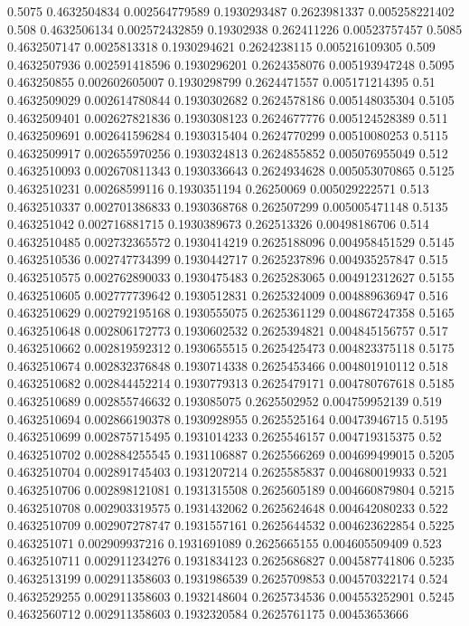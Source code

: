 {0.5075 0.4632504834 0.002564779589 0.1930293487 0.2623981337 0.005258221402
0.508 0.4632506134 0.002572432859 0.19302938 0.262411226 0.00523757457
0.5085 0.4632507147 0.0025813318 0.1930294621 0.2624238115 0.005216109305
0.509 0.4632507936 0.002591418596 0.1930296201 0.2624358076 0.005193947248
0.5095 0.463250855 0.002602605007 0.1930298799 0.2624471557 0.005171214395
0.51 0.4632509029 0.002614780844 0.1930302682 0.2624578186 0.005148035304
0.5105 0.4632509401 0.002627821836 0.1930308123 0.2624677776 0.005124528389
0.511 0.4632509691 0.002641596284 0.1930315404 0.2624770299 0.00510080253
0.5115 0.4632509917 0.002655970256 0.1930324813 0.2624855852 0.005076955049
0.512 0.4632510093 0.002670811343 0.1930336643 0.2624934628 0.005053070865
0.5125 0.4632510231 0.00268599116 0.1930351194 0.26250069 0.005029222571
0.513 0.4632510337 0.002701386833 0.1930368768 0.262507299 0.005005471148
0.5135 0.463251042 0.002716881715 0.1930389673 0.262513326 0.00498186706
0.514 0.4632510485 0.002732365572 0.1930414219 0.2625188096 0.004958451529
0.5145 0.4632510536 0.002747734399 0.1930442717 0.2625237896 0.004935257847
0.515 0.4632510575 0.002762890033 0.1930475483 0.2625283065 0.004912312627
0.5155 0.4632510605 0.002777739642 0.1930512831 0.2625324009 0.004889636947
0.516 0.4632510629 0.002792195168 0.1930555075 0.2625361129 0.004867247358
0.5165 0.4632510648 0.002806172773 0.1930602532 0.2625394821 0.004845156757
0.517 0.4632510662 0.002819592312 0.1930655515 0.2625425473 0.004823375118
0.5175 0.4632510674 0.002832376848 0.1930714338 0.2625453466 0.004801910112
0.518 0.4632510682 0.002844452214 0.1930779313 0.2625479171 0.004780767618
0.5185 0.4632510689 0.002855746632 0.193085075 0.2625502952 0.004759952139
0.519 0.4632510694 0.002866190378 0.1930928955 0.2625525164 0.00473946715
0.5195 0.4632510699 0.002875715495 0.1931014233 0.2625546157 0.004719315375
0.52 0.4632510702 0.002884255545 0.1931106887 0.2625566269 0.004699499015
0.5205 0.4632510704 0.002891745403 0.1931207214 0.2625585837 0.004680019933
0.521 0.4632510706 0.002898121081 0.1931315508 0.2625605189 0.004660879804
0.5215 0.4632510708 0.002903319575 0.1931432062 0.2625624648 0.004642080233
0.522 0.4632510709 0.002907278747 0.1931557161 0.2625644532 0.004623622854
0.5225 0.463251071 0.002909937216 0.1931691089 0.2625665155 0.004605509409
0.523 0.4632510711 0.002911234276 0.1931834123 0.2625686827 0.004587741806
0.5235 0.4632513199 0.002911358603 0.1931986539 0.2625709853 0.004570322174
0.524 0.4632529255 0.002911358603 0.1932148604 0.2625734536 0.004553252901
0.5245 0.4632560712 0.002911358603 0.1932320584 0.2625761175 0.00453653666
}
